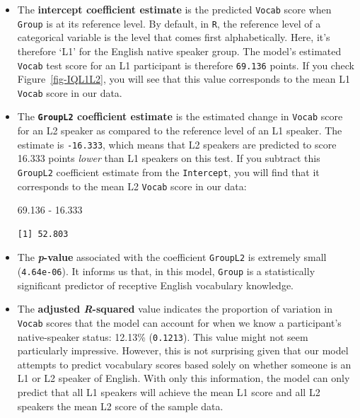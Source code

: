 \documentclass[
  letterpaper,
  DIV=11,
  numbers=noendperiod]{scrreprt}
\newenvironment{Shaded}{\begin{snugshade}}{\end{snugshade}}
\newcommand{\FloatTok}[1]{\textcolor[rgb]{0.68,0.00,0.00}{#1}}
\newcommand{\SpecialCharTok}[1]{\textcolor[rgb]{0.37,0.37,0.37}{#1}}
\begin{document}
\begin{itemize}
\item
  The \textbf{intercept coefficient estimate} is the predicted
  \texttt{Vocab} score when \texttt{Group} is at its reference level. By
  default, in \texttt{R}, the reference level of a categorical variable
  is the level that comes first alphabetically. Here, it's therefore
  `L1' for the English native speaker group. The model's estimated
  \texttt{Vocab} test score for an L1 participant is therefore
  \texttt{69.136} points. If you check Figure~\ref{fig-IQL1L2}, you will
  see that this value corresponds to the mean L1 \texttt{Vocab} score in
  our data.
\item
  The \textbf{\texttt{GroupL2} coefficient estimate} is the estimated
  change in \texttt{Vocab} score for an L2 speaker as compared to the
  reference level of an L1 speaker. The estimate is \texttt{-16.333},
  which means that L2 speakers are predicted to score 16.333 points
  \emph{lower} than L1 speakers on this test. If you subtract this
  \texttt{GroupL2} coefficient estimate from the \texttt{Intercept}, you
  will find that it corresponds to the mean L2 \texttt{Vocab} score in
  our data:

\begin{Shaded}
\begin{Highlighting}[]
\FloatTok{69.136} \SpecialCharTok{{-}} \FloatTok{16.333}
\end{Highlighting}
\end{Shaded}

\begin{verbatim}
[1] 52.803
\end{verbatim}
\item
  The \textbf{\emph{p}-value} associated with the coefficient
  \texttt{GroupL2} is extremely small (\texttt{4.64e-06}). It informs us
  that, in this model, \texttt{Group} is a statistically significant
  predictor of receptive English vocabulary knowledge.
\item
  The \textbf{adjusted \emph{R}-squared} value indicates the proportion
  of variation in \texttt{Vocab} scores that the model can account for
  when we know a participant's native-speaker status: 12.13\%
  (\texttt{0.1213}). This value might not seem particularly impressive.
  However, this is not surprising given that our model attempts to
  predict vocabulary scores based solely on whether someone is an L1 or
  L2 speaker of English. With only this information, the model can only
  predict that all L1 speakers will achieve the mean L1 score and all L2
  speakers the mean L2 score of the sample data.
\end{itemize}
\end{document}
